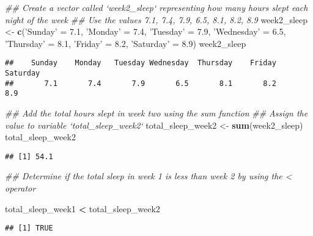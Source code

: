 \documentclass[
]{article}
\newenvironment{Shaded}{\begin{snugshade}}{\end{snugshade}}
\newcommand{\CommentTok}[1]{\textcolor[rgb]{0.56,0.35,0.01}{\textit{#1}}}
\newcommand{\FloatTok}[1]{\textcolor[rgb]{0.00,0.00,0.81}{#1}}
\newcommand{\KeywordTok}[1]{\textcolor[rgb]{0.13,0.29,0.53}{\textbf{#1}}}
\newcommand{\NormalTok}[1]{#1}
\newcommand{\OperatorTok}[1]{\textcolor[rgb]{0.81,0.36,0.00}{\textbf{#1}}}
\newcommand{\StringTok}[1]{\textcolor[rgb]{0.31,0.60,0.02}{#1}}
\begin{document}
\begin{Shaded}
\begin{Highlighting}[]
\CommentTok{## Create a vector called `week2_sleep` representing how many hours slept each night of the week}
\CommentTok{## Use the values 7.1, 7.4, 7.9, 6.5, 8.1, 8.2, 8.9}
\NormalTok{week2_sleep <-}\StringTok{ }\KeywordTok{c}\NormalTok{(}\StringTok{'Sunday'}\NormalTok{ =}\StringTok{ }\FloatTok{7.1}\NormalTok{, }\StringTok{'Monday'}\NormalTok{ =}\StringTok{ }\FloatTok{7.4}\NormalTok{, }\StringTok{'Tuesday'}\NormalTok{ =}\StringTok{ }\FloatTok{7.9}\NormalTok{,}
                 \StringTok{'Wednesday'}\NormalTok{ =}\StringTok{ }\FloatTok{6.5}\NormalTok{, }\StringTok{'Thursday'}\NormalTok{ =}\StringTok{ }\FloatTok{8.1}\NormalTok{, }\StringTok{'Friday'}\NormalTok{ =}\StringTok{ }\FloatTok{8.2}\NormalTok{,}
                 \StringTok{'Saturday'}\NormalTok{ =}\StringTok{ }\FloatTok{8.9}\NormalTok{)}
\NormalTok{week2_sleep}
\end{Highlighting}
\end{Shaded}

\begin{verbatim}
##    Sunday    Monday   Tuesday Wednesday  Thursday    Friday  Saturday 
##       7.1       7.4       7.9       6.5       8.1       8.2       8.9
\end{verbatim}

\begin{Shaded}
\begin{Highlighting}[]
\CommentTok{## Add the total hours slept in week two using the sum function}
\CommentTok{## Assign the value to variable `total_sleep_week2`}
\NormalTok{total_sleep_week2 <-}\StringTok{ }\KeywordTok{sum}\NormalTok{(week2_sleep)}
\NormalTok{total_sleep_week2}
\end{Highlighting}
\end{Shaded}

\begin{verbatim}
## [1] 54.1
\end{verbatim}

\begin{Shaded}
\begin{Highlighting}[]
\CommentTok{## Determine if the total sleep in week 1 is less than week 2 by using the < operator}

\NormalTok{total_sleep_week1 }\OperatorTok{<}\StringTok{ }\NormalTok{total_sleep_week2}
\end{Highlighting}
\end{Shaded}

\begin{verbatim}
## [1] TRUE
\end{verbatim}
\end{document}
